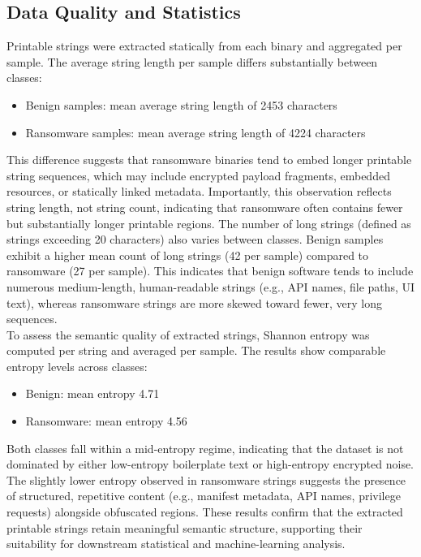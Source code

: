 \documentclass[conference]{IEEEtran}
\begin{document}
\subsection{Data Quality and Statistics}
Printable strings were extracted statically from each binary and aggregated per sample. The average string length per sample differs substantially between classes:
\begin{itemize}
    \item Benign samples: mean average string length of 2453 characters
    \item Ransomware samples: mean average string length of 4224 characters
\end{itemize}

This difference suggests that ransomware binaries tend to embed longer printable string sequences, which may include encrypted payload fragments, embedded resources, or statically linked metadata. Importantly, this observation reflects string length, not string count, indicating that ransomware often contains fewer but substantially longer printable regions. The number of long strings (defined as strings exceeding 20 characters) also varies between classes. Benign samples exhibit a higher mean count of long strings (42 per sample) compared to ransomware (27 per sample). This indicates that benign software tends to include numerous medium-length, human-readable strings (e.g., API names, file paths, UI text), whereas ransomware strings are more skewed toward fewer, very long sequences.\\

To assess the semantic quality of extracted strings, Shannon entropy was computed per string and averaged per sample. The results show comparable entropy levels across classes:
\begin{itemize}
    \item Benign: mean entropy 4.71
    \item Ransomware: mean entropy 4.56
\end{itemize}
Both classes fall within a mid-entropy regime, indicating that the dataset is not dominated by either low-entropy boilerplate text or high-entropy encrypted noise. The slightly lower entropy observed in ransomware strings suggests the presence of structured, repetitive content (e.g., manifest metadata, API names, privilege requests) alongside obfuscated regions. These results confirm that the extracted printable strings retain meaningful semantic structure, supporting their suitability for downstream statistical and machine-learning analysis.\\
\end{document}
